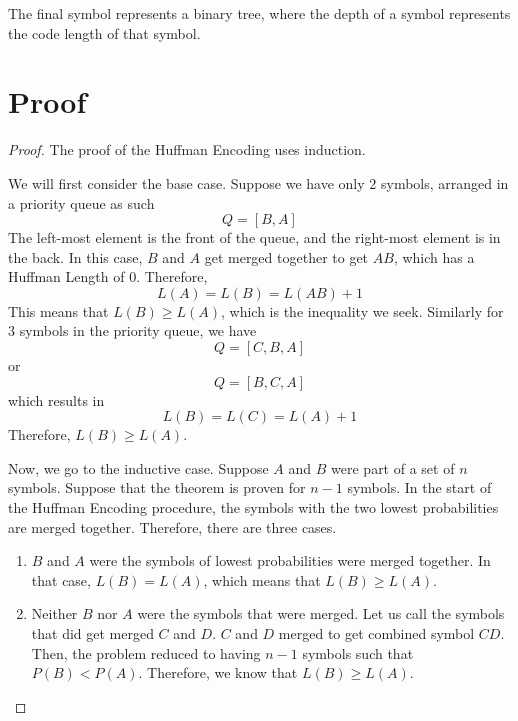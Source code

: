 \documentclass{article}
\begin{document}
The final symbol represents a binary tree, where the depth of a symbol represents the code length of that symbol.

\section*{Proof}
	\begin{proof}
		The proof of the Huffman Encoding uses induction. 

		We will first consider the base case. Suppose we have only $2$ symbols, arranged in a priority queue as such
		$$
		Q = [B, A]
		$$
		The left-most element is the front of the queue, and the right-most element is in the back. In this case, $B$ and $A$ get merged together to get $AB$, which has a Huffman Length of $0$. Therefore, 
		$$
		L(A) = L(B) = L(AB) + 1
		$$
		This means that $L(B) \geq L(A)$, which is the inequality we seek. Similarly for $3$ symbols in the priority queue, we have 
		$$
		Q = [C, B, A]
		$$
		or
		$$
		Q = [B, C, A]
		$$
		which results in
		$$
		L(B) = L(C) = L(A) + 1
		$$
		Therefore, $L(B) \geq L(A)$.

		Now, we go to the inductive case. Suppose $A$ and $B$ were part of a set of $n$ symbols. Suppose that the theorem is proven for $n-1$ symbols. In the start of the Huffman Encoding procedure, the symbols with the two lowest probabilities are merged together.
		Therefore, there are three cases.

		\begin{enumerate}
			\item $B$ and $A$ were the symbols of lowest probabilities were merged together. In that case, $L(B) = L(A)$, which means that $L(B) \geq L(A)$. 

			\item Neither $B$ nor $A$ were the symbols that were merged. Let us call the symbols that did get merged $C$ and $D$. $C$ and $D$ merged to get combined symbol $CD$. Then, the problem reduced to having $n-1$ symbols such that $P(B) < P(A)$. Therefore, we know that $L(B) \geq L(A)$.


\end{enumerate}
\end{proof}
\end{document}
